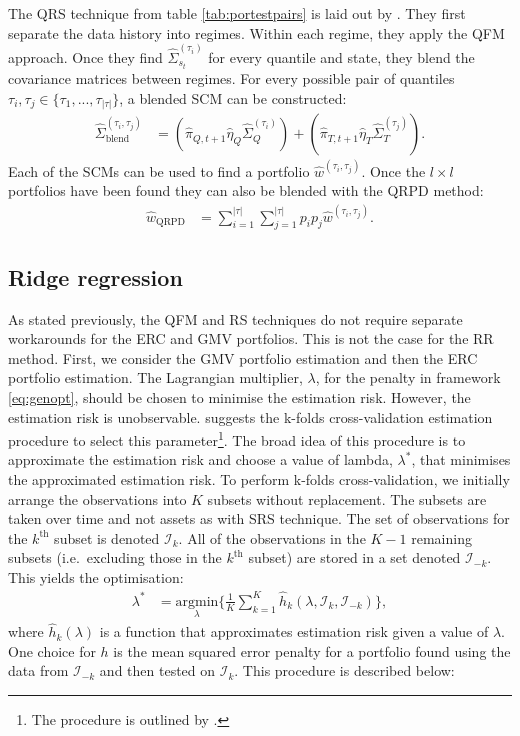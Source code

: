 \documentclass[
]{article}
\begin{document}
The QRS technique from table \ref{tab:portestpairs} is laid out by \citet{FD18}. They first separate the
data history into regimes. Within each regime, they apply the QFM approach. Once they find
\(\hat{\Sigma}_{s_t}^{(\tau_i)}\) for every quantile and state, they blend the covariance matrices
between regimes. For every possible pair of quantiles
\(\tau_i, \tau_j \in \{\tau_1, ..., \tau_{|\tau|}\}\), a blended SCM can be constructed:
\begin{align}
\hat{\Sigma}^{(\tau_i, \tau_j)}_{\text{blend}} & = (\hat{\pi}_{Q, t  + 1}\hat{\eta}_Q\hat{\Sigma}^{(\tau_i)}_Q) + (\hat{\pi}_{T, t  + 1}\hat{\eta}_T\hat{\Sigma}^{(\tau_j)}_T).
\end{align}
Each of the SCMs can be used to find a portfolio \(\hat{w}^{(\tau_i, \tau_j)}\). Once the \(l \times l\)
portfolios have been found they can also be blended with the QRPD method:
\begin{align}
\hat{w}_{\text{QRPD}} & =  \sum_{i = 1}^{|\tau|}  \sum_{j = 1}^{|\tau|} p_i p_j \hat{w}^{(\tau_i, \tau_j)}.
\end{align}

\hypertarget{ridge-regression}{%
\subsection{Ridge regression}\label{ridge-regression}}

As stated previously, the QFM and RS techniques do not require separate workarounds for the ERC and
GMV portfolios. This is not the case for the RR method. First, we consider the GMV portfolio
estimation and then the ERC portfolio estimation. The Lagrangian multiplier, \(\lambda\), for the
penalty in framework \eqref{eq:genopt}, should be chosen to minimise the estimation risk. However, the
estimation risk is unobservable. \citet{K18} suggests the k-folds cross-validation estimation procedure to
select this parameter\footnote{The procedure is outlined by \citet{FHT01}.}. The broad idea of this procedure is to
approximate the estimation risk and choose a value of lambda, \(\lambda^*\), that minimises the
approximated estimation risk. To perform k-folds cross-validation, we initially arrange the
observations into \(K\) subsets without replacement. The subsets are taken over time and not assets as
with SRS technique. The set of observations for the \(k^{\text{th}}\) subset is denoted \(\mathcal{I}_k\).
All of the observations in the \(K - 1\) remaining subsets (i.e.~excluding those in the \(k^{\text{th}}\)
subset) are stored in a set denoted \(\mathcal{I}_{-k}\). This yields the optimisation:
\begin{align}  
\lambda^* & = \underset{\lambda}{\text{argmin}} \Big \{ \frac{1}{K} \sum_{k =1}^K \hat{h}_k(\lambda, \mathcal{I}_k, \mathcal{I}_{-k})\Big \}, \label{eq:scorefunc}
\end{align}
where \(\hat{h}_k(\lambda)\) is a function that approximates estimation risk given a value of \(\lambda\).
One choice for \(h\) is the mean squared error penalty for a portfolio found using the data from
\(\mathcal{I}_{-k}\) and then tested on \(\mathcal{I}_k\). This procedure is described below:
\end{document}
